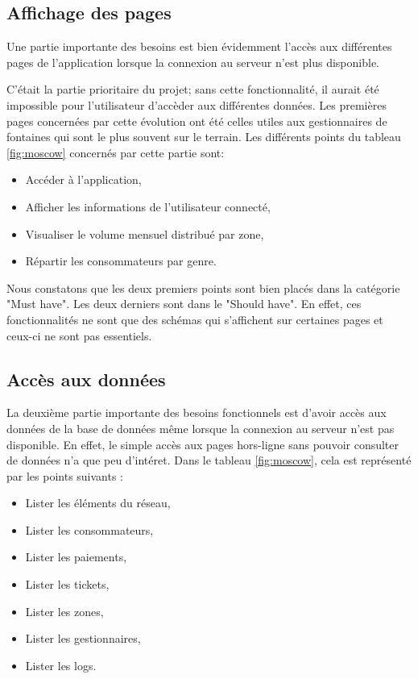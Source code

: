 \documentclass{EPL-master-thesis-covers-FR}
\begin{document}
			
			\subsection*{Affichage des pages}
				Une partie importante des besoins est bien évidemment l'accès aux différentes pages de l'application lorsque la connexion au serveur n'est plus disponible. 
				
				C'était la partie prioritaire du projet; sans cette fonctionnalité, il aurait été impossible pour l'utilisateur d'accèder aux différentes données. Les premières pages concernées par cette évolution ont été celles utiles aux gestionnaires de fontaines qui sont le plus souvent sur le terrain.
				Les différents points du tableau \ref{fig:moscow} concernés par cette partie sont:
				\begin{itemize}[noitemsep]
					\item Accéder à l'application,
					\item Afficher les informations de l'utilisateur connecté,
					\item Visualiser le volume mensuel distribué par zone,
					\item Répartir les consommateurs par genre.
				\end{itemize}
				
				Nous constatons que les deux premiers points sont bien placés dans la catégorie "Must have". Les deux derniers sont dans le "Should have". En effet, ces fonctionnalités ne sont que des schémas qui s'affichent sur certaines pages et ceux-ci ne sont pas essentiels.
				
				
			\subsection*{Accès aux données}
				La deuxième partie importante des besoins fonctionnels est d'avoir accès aux données de la base de données même lorsque la connexion au serveur n'est pas disponible. En effet, le simple accès aux pages hors-ligne sans pouvoir consulter de données n'a que peu d'intéret.
			Dans le tableau \ref{fig:moscow}, cela est représenté par les points suivants :
				\begin{itemize}[noitemsep]
					\item Lister les éléments du réseau,
					\item Lister les consommateurs,
					\item Lister les paiements,
					\item Lister les tickets,
					\item Lister les zones,
					\item Lister les gestionnaires,
					\item Lister les logs.
				\end{itemize}
				
\end{document}
